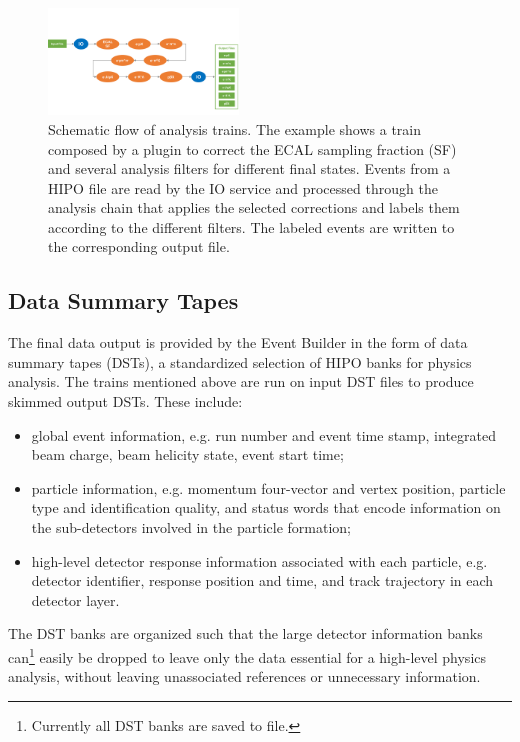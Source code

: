 \begin{figure}
    \includegraphics[width=0.45\textwidth,height=0.2\textheight]{pics/train.pdf}
    \caption{Schematic flow of analysis trains.  The example shows a train composed by a plugin to correct the ECAL sampling fraction (SF) and several analysis filters for different final states. Events from a HIPO file are read by the IO service and processed through the analysis chain that applies the selected corrections and labels them according to the different filters. The labeled events are written to the corresponding output file.\label{fig:train}}
\end{figure}

\subsection{Data Summary Tapes}
\label{sec:dsts}

The final data output is provided by the Event Builder in the form of data summary tapes (DSTs), a standardized
selection of HIPO banks for physics analysis. The trains mentioned above are run on input DST files to produce
skimmed output DSTs. These include:

\begin{itemize}
\item global event information, e.g. run number and event time stamp, integrated beam charge, beam helicity state,
  event start time;
\item particle information, e.g. momentum four-vector and vertex position, particle type and identification quality,
  and status words that encode information on the sub-detectors involved in the particle formation;
\item high-level detector response information associated with each particle, e.g. detector identifier, response
  position and time, and track trajectory in each detector layer.
\end{itemize}

\noindent
The DST banks are organized such that the large detector information banks can\footnote{Currently all DST banks are saved to file.} easily be dropped to leave only
the data essential for a high-level physics analysis, without leaving unassociated references or unnecessary information.

